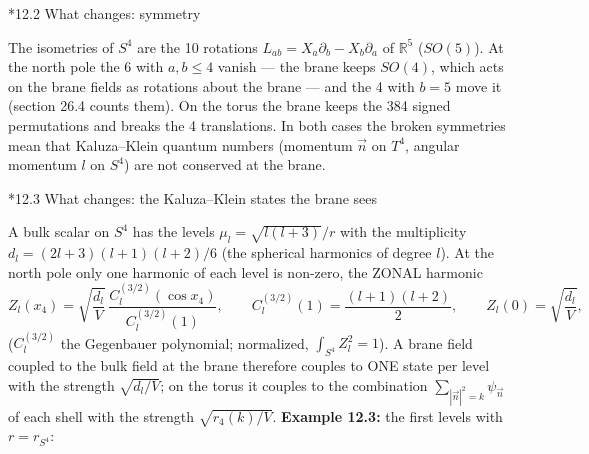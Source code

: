 \documentclass[10pt,a4paper]{article}
\makeatletter
\renewcommand\subsection{\@startsection{subsection}{2}{\z@}{-3.25ex\@plus -1ex \@minus -.2ex}{1.5ex \@plus .2ex}{\normalfont\large\bfseries\raggedright}}
\makeatother
\begin{document}
\subsection*{12.2 What changes: symmetry}
The isometries of $S^4$ are the 10 rotations $L_{ab}=X_a\partial_b-X_b\partial_a$ of $\mathbb R^5$ ($SO(5)$). At the north pole the 6 with $a,b\le4$ vanish — the brane keeps $SO(4)$, which acts on the brane fields as rotations about the brane — and the 4 with $b=5$ move it (section 26.4 counts them). On the torus the brane keeps the 384 signed permutations and breaks the 4 translations. In both cases the broken symmetries mean that Kaluza–Klein quantum numbers (momentum $\vec n$ on $T^4$, angular momentum $l$ on $S^4$) are not conserved at the brane.

\subsection*{12.3 What changes: the Kaluza–Klein states the brane sees}
A bulk scalar on $S^4$ has the levels $\mu_l=\sqrt{l(l+3)}/r$ with the multiplicity $d_l=(2l+3)(l+1)(l+2)/6$ (the spherical harmonics of degree $l$). At the north pole only one harmonic of each level is non-zero, the ZONAL harmonic
\begin{equation*}
Z_l(x_4)=\sqrt{\frac{d_l}V}\,\frac{C_l^{(3/2)}(\cos x_4)}{C_l^{(3/2)}(1)},\qquad C_l^{(3/2)}(1)=\frac{(l+1)(l+2)}2,\qquad Z_l(0)=\sqrt{\frac{d_l}V},
\end{equation*}
($C_l^{(3/2)}$ the Gegenbauer polynomial; normalized, $\int_{S^4}Z_l^2=1$). A brane field coupled to the bulk field at the brane therefore couples to ONE state per level with the strength $\sqrt{d_l/V}$; on the torus it couples to the combination $\sum_{|\vec n|^2=k}\psi_{\vec n}$ of each shell with the strength $\sqrt{r_4(k)/V}$. \textbf{Example 12.3:} the first levels with $r=r_{S^4}$:
\end{document}
